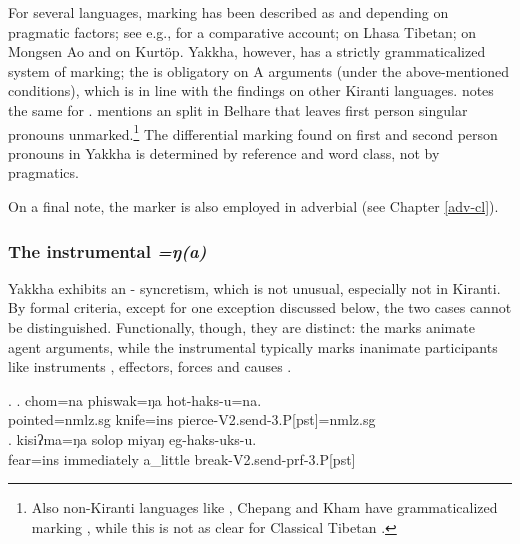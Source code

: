 	
\newpage
For several  languages,  marking has been described as  and depending on pragmatic factors; see e.g., \citet{LaPolla1995_Ergative} for a comparative account; \citet{Tournadre1991_Rhetorical} on Lhasa Tibetan; \citet{Coupe2007_Mongsen} on Mongsen Ao and \citet{Hyslop2011_Kurtop} on Kurtöp. Yakkha, however, has a strictly grammaticalized system of  marking; the  is obligatory on A arguments (under the above-mentioned conditions), which is in line with the findings on other Kiranti languages. \citet[74]{Doornenbal2009A-grammar} notes  the same for .  \citet[549]{Bickel2003Belhare} mentions an  split in Belhare that leaves first person singular pronouns unmarked.\footnote{Also non-Kiranti languages like , Chepang and Kham have  grammaticalized  marking \citep{LaPolla1995_Ergative}, while this is not as clear for Classical Tibetan \citep{DeLancey2011_Optional}.} The differential marking found on first and second person pronouns in Yakkha is determined by reference and word class, not by pragmatics. 

On a final note, the  marker is also employed in adverbial  (see Chapter \ref{adv-cl}).


\subsubsection{The instrumental \emph{=ŋ(a)}}\label{case-ins}
Yakkha exhibits an - syncretism, which is not unusual, especially not in Kiranti. By formal criteria, except for one exception discussed below, the two cases cannot be distinguished.  Functionally, though, they are distinct: the  marks animate agent arguments, while the instrumental  typically marks inanimate participants like  instruments \Next[a], effectors, forces and causes \Next[b]. 

	\ex. \ag. chom=na phiswak=ŋa hot-haks-u=na.\\
	pointed{\sc =nmlz.sg} knife{\sc =ins} pierce-{\sc V2.send-3.P[pst]=nmlz.sg}\\
	\bg. kisiʔma=ŋa solop miyaŋ eg-haks-uks-u.\\
		fear{\sc =ins} immediately a\_little  break{\sc-V2.send-prf-3.P[pst]}\\
		 
		
